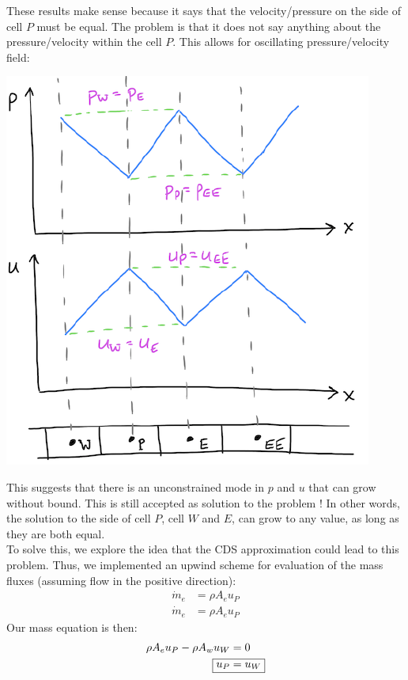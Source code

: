 \documentclass[11pt]{article}
\begin{document}
These results make sense because it says that the velocity/pressure on the side of cell \(P\) must be equal. The problem is that it does not
say anything about the pressure/velocity within the cell \(P\).  This allows for oscillating pressure/velocity field:
\begin{center}
\includegraphics[scale=0.8]{pic/cellP_Oscillating.png}
\end{center}
This suggests that there is an unconstrained mode in \(p\) and \(u\) that can grow without bound. This is still accepted
as solution to the problem ! In other words, the solution to the side of cell \(P\), cell \(W\) and \(E\), can grow to
any value, as long as they are both equal.\\
To solve this, we explore the idea that the CDS approximation could lead to this problem. Thus, we implemented
an upwind scheme for evaluation of the mass fluxes (assuming flow in the positive direction):
\begin{equation*}
\begin{aligned}
\dot{m}_e &= \rho A_e u_P\\
\dot{m}_e &= \rho A_e u_P
\end{aligned}
\end{equation*}
Our mass equation is then:
\begin{equation*}
\begin{aligned}
\rho A_e u_P - \rho A_w u_W &= 0\\
\Aboxed{u_P &= u_W}
\end{aligned}
\end{equation*}
\end{document}
